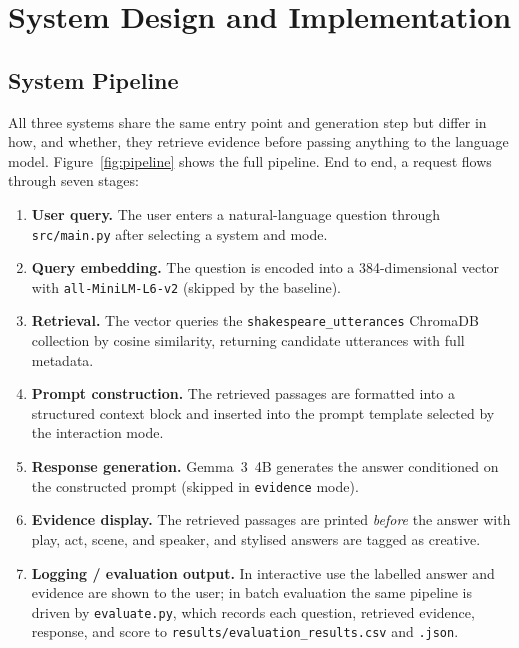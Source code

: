 \section{System Design and Implementation}
\label{sec:system}



\subsection{System Pipeline}
All three systems share the same entry point and generation step but
differ in how, and whether, they retrieve evidence before passing
anything to the language model. Figure~\ref{fig:pipeline} shows the full
pipeline. End to end, a request flows through seven stages:

\begin{enumerate}
  \item \textbf{User query.} The user enters a natural-language question
  through \texttt{src/main.py} after selecting a system and mode.
  \item \textbf{Query embedding.} The question is encoded into a
  384-dimensional vector with \texttt{all-MiniLM-L6-v2} (skipped by the
  baseline).
  \item \textbf{Retrieval.} The vector queries the
  \texttt{shakespeare\_utterances} ChromaDB collection by cosine
  similarity, returning candidate utterances with full metadata.
  \item \textbf{Prompt construction.} The retrieved passages are formatted
  into a structured context block and inserted into the prompt template
  selected by the interaction mode.
  \item \textbf{Response generation.} Gemma~3~4B generates the answer
  conditioned on the constructed prompt (skipped in \texttt{evidence}
  mode).
  \item \textbf{Evidence display.} The retrieved passages are printed
  \emph{before} the answer with play, act, scene, and speaker, and
  stylised answers are tagged as creative.
  \item \textbf{Logging / evaluation output.} In interactive use the
  labelled answer and evidence are shown to the user; in batch evaluation
  the same pipeline is driven by \texttt{evaluate.py}, which records each
  question, retrieved evidence, response, and score to
  \texttt{results/evaluation\_results.csv} and \texttt{.json}.
\end{enumerate}

